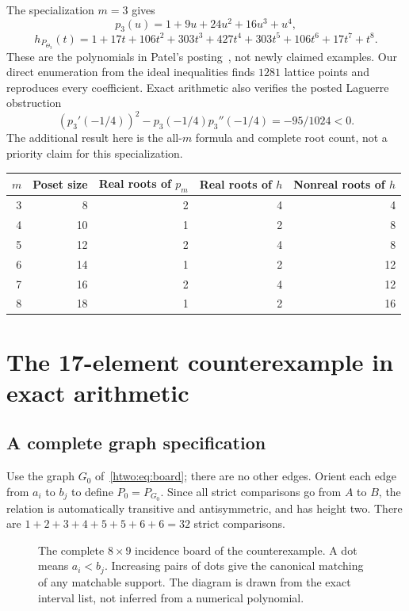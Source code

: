 \documentclass[11pt]{article}
\numberwithin{equation}{section}
\theoremstyle{definition}
\begin{document}
The specialization $m=3$ gives
\[
 p_3(u)=1+9u+24u^2+16u^3+u^4,
\]
\[
 h_{P_{\Theta_3}}(t)=1+17t+106t^2+303t^3+427t^4
                    +303t^5+106t^6+17t^7+t^8.
\]
These are the polynomials in Patel's posting~\cite{Patel}, not newly
claimed examples. Our direct enumeration from the ideal inequalities
finds $1281$ lattice points and reproduces every coefficient. Exact
arithmetic also verifies the posted Laguerre obstruction
\[
 (p_3'(-1/4))^2-p_3(-1/4)p_3''(-1/4)=-95/1024<0.
\]
The additional result here is the all-$m$ formula and complete root count,
not a priority claim for this specialization.

\begin{center}
\small
\begin{tabular}{@{}rrrrr@{}}
\toprule
$m$ & Poset size & Real roots of $p_m$ & Real roots of $h$ & Nonreal roots of $h$\\
\midrule
3&8&2&4&4\\
4&10&1&2&8\\
5&12&2&4&8\\
6&14&1&2&12\\
7&16&2&4&12\\
8&18&1&2&16\\
\bottomrule
\end{tabular}
\end{center}

\section{The 17-element counterexample in exact arithmetic}\label{htwo:sec:counter}

\subsection{A complete graph specification}

Use the graph $G_0$ of~\eqref{htwo:eq:board}; there are no other edges. Orient
each edge from $a_i$ to $b_j$ to define $P_0=P_{G_0}$. Since all strict
comparisons go from $A$ to $B$, the relation is automatically transitive
and antisymmetric, and has height two. There are
$1+2+3+4+5+5+6+6=32$ strict comparisons.

\begin{figure}[ht]
\centering
{}
\caption{The complete $8\times9$ incidence board of the counterexample.
A dot means $a_i<b_j$. Increasing pairs of dots give the canonical matching
of any matchable support. The diagram is drawn from the exact interval list,
not inferred from a numerical polynomial.}\label{htwo:fig:board}
\end{figure}
\end{document}
